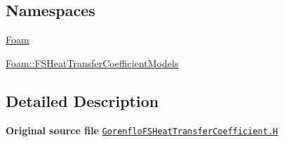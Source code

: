 \subsection*{Namespaces}
\begin{DoxyCompactItemize}
\item 
 \hyperlink{namespaceFoam}{Foam}
\item 
 \hyperlink{namespaceFoam_1_1FSHeatTransferCoefficientModels}{Foam\+::\+F\+S\+Heat\+Transfer\+Coefficient\+Models}
\end{DoxyCompactItemize}


\subsection{Detailed Description}
{\bfseries Original source file} \href{../../../home/carlo/data/GeN-Foam/GeN-Foam_ffn/GeN-Foam/GeN-Foam/classes/thermalHydraulics/src/physicsModels/heatTransferModels/FSHeatTransferCoefficientModels/Gorenflo/GorenfloFSHeatTransferCoefficient.H}{\tt Gorenflo\+F\+S\+Heat\+Transfer\+Coefficient.\+H} 